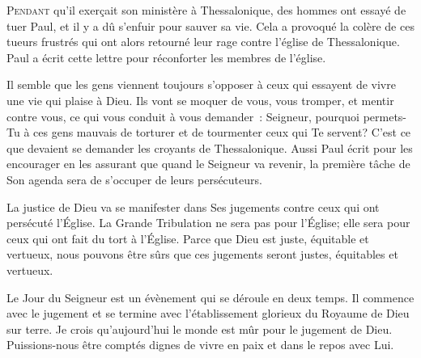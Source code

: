 


\lettrine{P}{endant} qu'il exerçait son ministère à Thessalonique,
 des hommes ont essayé de tuer Paul, et il y a dû s'enfuir pour sauver sa vie.
 Cela a provoqué la colère de ces tueurs frustrés qui ont alors retourné
 leur rage contre l'église de Thessalonique. Paul a écrit cette lettre
 pour réconforter les membres de l'église.

Il semble que les gens viennent toujours s'opposer à ceux qui essayent
 de vivre une vie qui plaise à Dieu. Ils vont se moquer de vous, vous tromper,
 et mentir contre vous, ce qui vous conduit à  vous demander~: 
 \og Seigneur, pourquoi permets-Tu  à ces gens mauvais de torturer
 et de tourmenter ceux qui Te servent? \fg{} 
 C'est ce que devaient se demander les croyants de Thessalonique.
 Aussi Paul écrit pour les encourager en les assurant que quand le Seigneur
 va revenir, la première tâche de Son agenda sera de s'occuper
 de leurs persécuteurs.


La justice de Dieu va se manifester dans Ses jugements contre ceux
 qui ont persécuté l'Église. La Grande Tribulation ne sera pas pour l'Église;
 elle sera pour ceux qui ont fait du tort à l'Église.
 Parce que Dieu est juste, équitable et vertueux, nous pouvons être sûrs
 que ces jugements seront justes, équitables et vertueux.

Le Jour du Seigneur est un évènement qui se déroule en
 deux temps. Il commence avec le jugement et se termine avec l'établissement
 glorieux du Royaume de Dieu sur terre. Je crois qu'aujourd'hui le monde
 est mûr pour le jugement de Dieu. Puissions-nous être comptés dignes de vivre
 en paix et dans le repos avec Lui.

\dvrule




